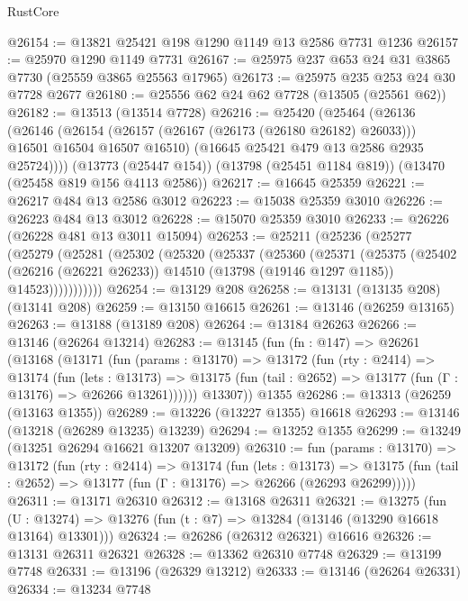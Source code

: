 \begin{lexlean}{RustCore}
\begin{coremodule}
@26154 := @13821 @25421 @198 @1290 @1149 @13 @2586 @7731 @1236
@26157 := @25970 @1290 @1149 @7731
@26167 := @25975 @237 @653 @24 @31 @3865 @7730 (@25559 @3865 @25563 @17965)
@26173 := @25975 @235 @253 @24 @30 @7728 @2677
@26180 := @25556 @62 @24 @62 @7728 (@13505 (@25561 @62))
@26182 := @13513 (@13514 @7728)
@26216 := @25420
    (@25464
      (@26136
        (@26146
          (@26154 (@26157 (@26167 (@26173 (@26180 @26182) @26033))) @16501 @16504 @16507 @16510)
          (@16645 @25421 @479 @13 @2586 @2935 @25724))))
    (@13773 (@25447 @154))
    (@13798 (@25451 @1184 @819))
    (@13470 (@25458 @819 @156 @4113 @2586))
@26217 := @16645 @25359
@26221 := @26217 @484 @13 @2586 @3012
@26223 := @15038 @25359 @3010
@26226 := @26223 @484 @13 @3012
@26228 := @15070 @25359 @3010
@26233 := @26226 (@26228 @481 @13 @3011 @15094)
@26253 := @25211
    (@25236
      (@25277
        (@25279
          (@25281
            (@25302
              (@25320
                (@25337
                  (@25360
                    (@25371
                      (@25375
                        (@25402
                          (@26216 (@26221 @26233))
                          @14510
                          (@13798 (@19146 @1297 @1185))
                          @14523)))))))))))
@26254 := @13129 @208
@26258 := @13131 (@13135 @208) (@13141 @208)
@26259 := @13150 @16615
@26261 := @13146 (@26259 @13165)
@26263 := @13188 (@13189 @208)
@26264 := @13184 @26263
@26266 := @13146 (@26264 @13214)
@26283 := @13145
    (fun (fn : @147) =>
    @26261
      (@13168
        (@13171
          (fun (params : @13170) =>
          @13172
            (fun (rty : @2414) =>
            @13174
              (fun (lets : @13173) =>
              @13175 (fun (tail : @2652) => @13177 (fun (Γ : @13176) => @26266 @13261))))))
        @13307))
    @1355
@26286 := @13313 (@26259 (@13163 @1355))
@26289 := @13226 (@13227 @1355) @16618
@26293 := @13146 (@13218 (@26289 @13235) @13239)
@26294 := @13252 @1355
@26299 := @13249 (@13251 @26294 @16621 @13207 @13209)
@26310 := fun (params : @13170) =>
  @13172
    (fun (rty : @2414) =>
    @13174
      (fun (lets : @13173) =>
      @13175 (fun (tail : @2652) => @13177 (fun (Γ : @13176) => @26266 (@26293 @26299)))))
@26311 := @13171 @26310
@26312 := @13168 @26311
@26321 := @13275
    (fun (U : @13274) => @13276 (fun (t : @7) => @13284 (@13146 (@13290 @16618 @13164) @13301)))
@26324 := @26286 (@26312 @26321) @16616
@26326 := @13131 @26311 @26321
@26328 := @13362 @26310 @7748
@26329 := @13199 @7748
@26331 := @13196 (@26329 @13212)
@26333 := @13146 (@26264 @26331)
@26334 := @13234 @7748

\end{coremodule}
\end{lexlean}

